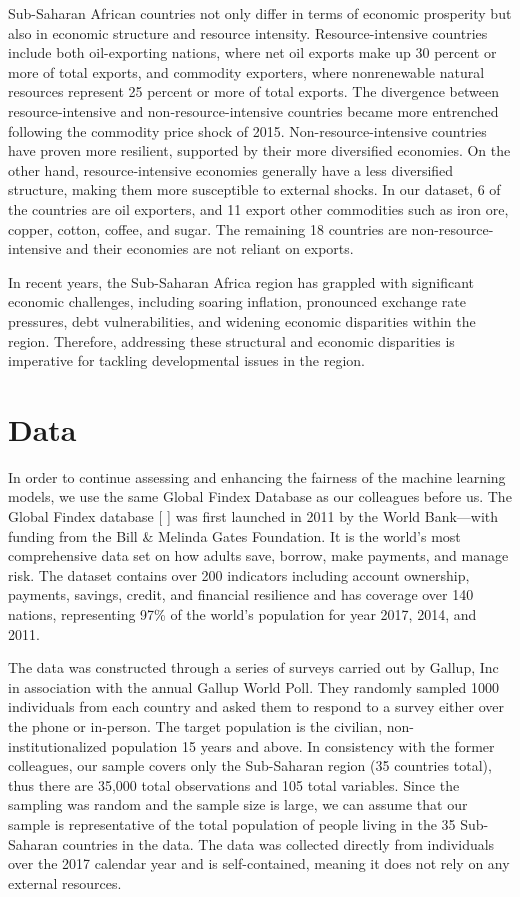 \documentclass[12pt]{article}
\begin{document}
Sub-Saharan African countries not only differ in terms of economic
prosperity but also in economic structure and resource intensity.
Resource-intensive countries include both oil-exporting nations, where
net oil exports make up 30 percent or more of total exports, and
commodity exporters, where nonrenewable natural resources represent 25
percent or more of total exports. The divergence between
resource-intensive and non-resource-intensive countries became more
entrenched following the commodity price shock of 2015.
Non-resource-intensive countries have proven more resilient, supported
by their more diversified economies. On the other hand,
resource-intensive economies generally have a less diversified
structure, making them more susceptible to external shocks. In our
dataset, 6 of the countries are oil exporters, and 11 export other
commodities such as iron ore, copper, cotton, coffee, and sugar. The
remaining 18 countries are non-resource-intensive and their economies
are not reliant on exports.

In recent years, the Sub-Saharan Africa region has grappled with
significant economic challenges, including soaring inflation, pronounced
exchange rate pressures, debt vulnerabilities, and widening economic
disparities within the region. Therefore, addressing these structural
and economic disparities is imperative for tackling developmental issues
in the region.

\hypertarget{data}{%
\section{Data}\label{data}}

In order to continue assessing and enhancing the fairness of the machine
learning models, we use the same Global Findex Database as our
colleagues before us. The Global Findex database {[} {]} was first
launched in 2011 by the World Bank---with funding from the Bill \&
Melinda Gates Foundation. It is the world's most comprehensive data set
on how adults save, borrow, make payments, and manage risk. The dataset
contains over 200 indicators including account ownership, payments,
savings, credit, and financial resilience and has coverage over 140
nations, representing 97\% of the world's population for year 2017,
2014, and 2011.

The data was constructed through a series of surveys carried out by
Gallup, Inc in association with the annual Gallup World Poll. They
randomly sampled 1000 individuals from each country and asked them to
respond to a survey either over the phone or in-person. The target
population is the civilian, non-institutionalized population 15 years
and above. In consistency with the former colleagues, our sample covers
only the Sub-Saharan region (35 countries total), thus there are 35,000
total observations and 105 total variables. Since the sampling was
random and the sample size is large, we can assume that our sample is
representative of the total population of people living in the 35
Sub-Saharan countries in the data. The data was collected directly from
individuals over the 2017 calendar year and is self-contained, meaning
it does not rely on any external resources.
\end{document}
